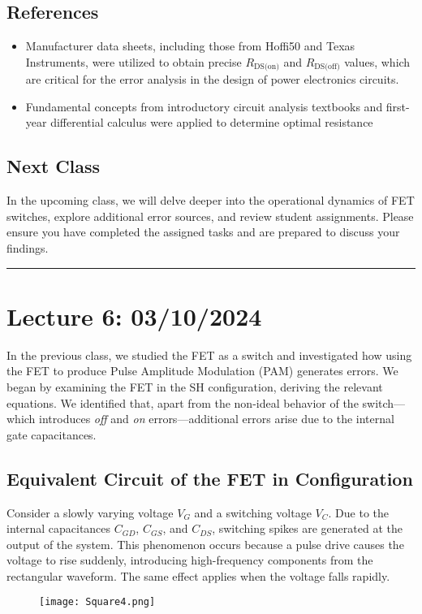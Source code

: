 \documentclass[a4paper,9pt,twoside,openany,twocolumn]{memoir}
\begin{document}
\subsection{References}
\begin{itemize}
    \item Manufacturer data sheets, including those from Hoffi50 and Texas 
    Instruments, were utilized to obtain precise \(R_{\text{DS(on)}}\) and 
    \(R_{\text{DS(off)}}\) values, which are critical for the error analysis 
    in the design of power electronics circuits.
    
    \item Fundamental concepts from introductory circuit analysis textbooks 
    and first-year differential calculus were applied to determine optimal 
    resistance
\end{itemize}

\subsection{Next Class}
In the upcoming class, we will delve deeper into the operational dynamics of FET switches, explore additional error sources, and review student assignments. Please ensure you have completed the assigned tasks and are prepared to discuss your findings.
\begin{center}\rule{0.5\linewidth}{0.5pt}\end{center}

\section*{Lecture 6: 03/10/2024}

In the previous class, we studied the FET as a switch and investigated how using the FET to produce Pulse Amplitude Modulation (PAM) generates errors. We began by examining the FET in the SH configuration, deriving the relevant equations. We identified that, apart from the non-ideal behavior of the switch—which introduces \textit{off} and \textit{on} errors—additional errors arise due to the internal gate capacitances.

\subsection{Equivalent Circuit of the FET in Configuration}

Consider a slowly varying voltage \( V_G \) and a switching voltage \( V_C \). Due to the internal capacitances \( C_{GD} \), \( C_{GS} \), and \( C_{DS} \), switching spikes are generated at the output of the system. This phenomenon occurs because a pulse drive causes the voltage to rise suddenly, introducing high-frequency components from the rectangular waveform. The same effect applies when the voltage falls rapidly.
\begin{figure}[h]
    \centering
    \texttt{[image: Square4.png]}
    \caption{}
\end{figure}
\end{document}
